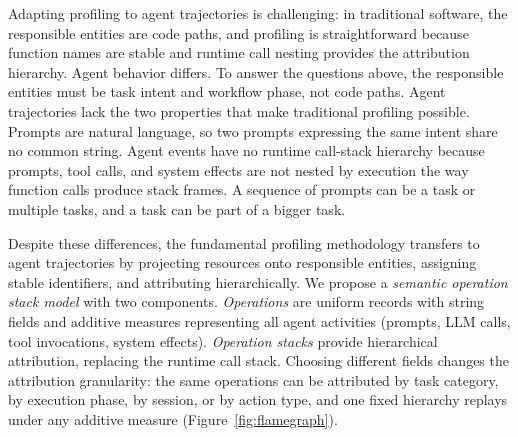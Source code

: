 \documentclass[sigconf,nonacm]{acmart}
\begin{document}
Adapting profiling to agent trajectories is challenging: in
traditional software, the responsible entities are code paths, and
profiling is straightforward because function names are stable and
runtime call nesting provides the attribution hierarchy.
Agent behavior differs. To answer the questions above, the responsible entities must be task intent and workflow phase, not code paths.
Agent trajectories lack the two properties that make traditional profiling possible.
Prompts are natural language, so two prompts expressing the same intent share no common string.
Agent events have no runtime call-stack hierarchy because prompts,
tool calls, and system effects are not nested by execution the way
function calls produce stack frames. A sequence of prompts can be a task or multiple tasks, and a task can be part of a bigger task.

Despite these differences, the fundamental profiling methodology
transfers to agent trajectories by projecting resources onto responsible
entities, assigning stable identifiers, and attributing hierarchically.
We propose a \emph{semantic operation stack model} with two
components.
\emph{Operations} are uniform records with string fields and
additive measures representing all agent activities (prompts, LLM
calls, tool invocations, system effects).
\emph{Operation stacks} provide hierarchical attribution, replacing the runtime call stack.
Choosing different fields changes the attribution granularity: the same operations can be attributed by task category, by execution phase, by session, or by action type, and one fixed hierarchy replays under any additive measure (Figure~\ref{fig:flamegraph}).
\end{document}

